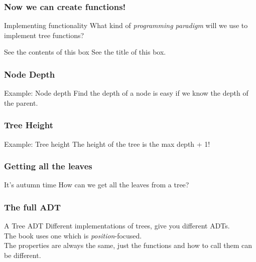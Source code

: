 \begin{frame}
	\frametitle{Now we can create functions!}
	\begin{questionblock}{Implementing functionality}
		What kind of \textit{programming paradigm} will we use to implement tree functions?
	\end{questionblock}
	\pause
	\begin{answerblock}{See the contents of this box}
		See the title of this box.
	\end{answerblock}
\end{frame}

\begin{frame}
	\frametitle{Node Depth}
		\begin{exampleblock}{Example: Node depth}
			Find the depth of a node is easy if we know the depth of the parent.
		\end{exampleblock}	
		\pause
		
\end{frame}

\begin{frame}
	\frametitle{Tree Height}
		\begin{exampleblock}{Example: Tree height}
			The height of the tree is the max depth + 1! 	
		\end{exampleblock}	
		\pause
		
\end{frame}

\begin{frame}
	\frametitle{Getting all the leaves}
	\begin{questionblock}{It's autumn time}
		How can we get all the leaves from a tree?
	\end{questionblock}
		\pause
		
\end{frame}

\begin{frame}
	\frametitle{The full ADT}
		\begin{alertblock}{A Tree ADT}
			Different implementations of trees, give you different ADTs.\\
			The book uses one which is \textit{position}-focused.\\
			The properties are always the same, just the functions and how to call them can be different.
		\end{alertblock}	
\end{frame}

